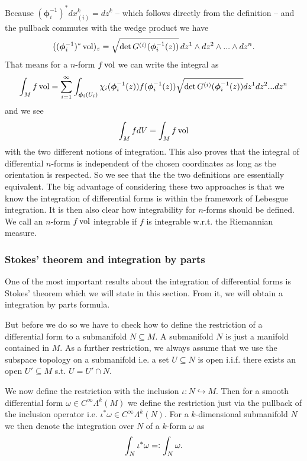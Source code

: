 \documentclass[../master_thesis.tex]{subfiles}
\begin{document}
Because $(\boldsymbol{\phi}_i^{-1})^* dx_{(i)}^k = dz^k$ -- which follows directly from the 
definition -- and the pullback commutes with the wedge product we have
\begin{align*}
    \big( (\boldsymbol{\phi}_i^{-1})^* \operatorname{vol})_z =  
        \sqrt{ \det G^{(i)}(\boldsymbol{\phi}_i^{-1}(z))} \,
        dz^1 \wedge dz^2 \wedge ... \wedge dz^n.
\end{align*}
That means for a $n$-form $f \operatorname{vol}$ we can write the integral as
\begin{align*}
    \int_M f \operatorname{vol} = \sum_{i=1}^\infty \int_{\boldsymbol{\phi}_i(U_i)} 
    \chi_i(\boldsymbol{\phi}_i^{-1}(z)) f(\boldsymbol{\phi}_i^{-1}(z))
        \sqrt{ \det G^{(i)}(\boldsymbol{\phi}_i^{-1}(z))} dz^1 dz^2 ... dz^n
\end{align*} 
and we see 
\begin{align*}
    \int_M f dV = \int_M f \operatorname{vol}
\end{align*}
with the two different notions of integration. This also proves that 
the integral of differential $n$-forms is independent of the chosen 
coordinates as long as the orientation is respected. So we see that the
the two definitions are essentially equivalent.
The big advantage of considering these two
approaches is that we know the integration of 
differential forms is within the framework of Lebesgue integration. 
It is then also 
clear how integrability for $n$-forms should be defined. We call an 
$n$-form $f \operatorname{vol}$ integrable if $f$ is integrable w.r.t. the Riemannian measure.

\subsubsection{Stokes' theorem and integration by parts} 

One of the most important results about the integration of differential forms
is Stokes' theorem which we will state in this section. From it, we will 
obtain a integration by parts formula.

But before we do so we have to check how to define the restriction of a
differential form to a submanifold $N \subseteq M$. A submanifold $N$ 
is just a manifold contained in $M$. As a further restriction, we always assume
that we use the subspace topology on a submanifold i.e. a set $U \subseteq N$ 
is open i.i.f. there exists an open $U' \subseteq M$ s.t. $U = U' \cap N$.

We now define the restriction with the inclusion $\iota: N \hookrightarrow M$. Then for a 
smooth differential form $\omega \in C^\infty \Lambda^k (M)$ we define 
the restriction just via the pullback of the inclusion operator i.e. 
$\iota^* \omega \in C^\infty \Lambda^k(N)$. 
For a $k$-dimensional submanifold $N$ we then denote the integration over $N$ of a 
$k$-form $\omega$ as
\begin{align*}
    \int_N \iota^*\omega =\vcentcolon \int_N \omega.
\end{align*} 
\end{document}

